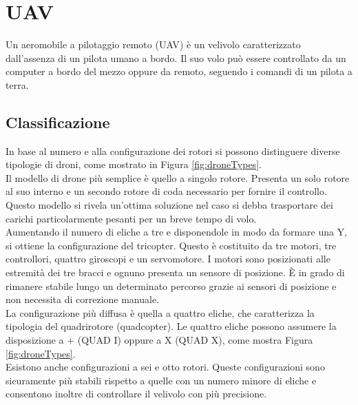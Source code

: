 
\chapter{UAV}\label{ch:uav}
Un aeromobile a pilotaggio remoto (\acs{UAV}) è un velivolo caratterizzato dall'assenza di un pilota umano a bordo. Il suo volo può essere controllato da un computer a bordo del mezzo oppure da remoto, seguendo i comandi di un pilota a terra.


\section{Classificazione}
In base al numero e alla configurazione dei rotori si possono distinguere diverse tipologie di droni, come mostrato in Figura \ref{fig:droneTypes}.\\

Il modello di drone più semplice è quello a singolo rotore. Presenta un solo rotore al suo interno e un secondo rotore di coda necessario per fornire il controllo. Questo modello si rivela un'ottima soluzione nel caso si debba trasportare dei carichi particolarmente pesanti per un breve tempo di volo.\\

Aumentando il numero di eliche a tre e disponendole in modo da formare una Y, si ottiene la configurazione del tricopter. Questo è costituito da tre motori, tre controllori, quattro giroscopi e un servomotore. I motori sono posizionati alle estremità dei tre bracci e ognuno presenta un sensore di posizione. È in grado di rimanere stabile lungo un determinato percorso grazie ai sensori di posizione e non necessita di correzione manuale.\\

La configurazione più diffusa è quella a quattro eliche, che caratterizza la tipologia del quadrirotore (quadcopter). Le quattro eliche possono assumere la disposizione a + (QUAD I) oppure a X (QUAD X), come mostra Figura \ref{fig:droneTypes}.\\

Esistono anche configurazioni a sei e otto rotori. Queste configurazioni sono sicuramente più stabili rispetto a quelle con un numero minore di eliche e consentono inoltre di controllare il velivolo con più precisione.

